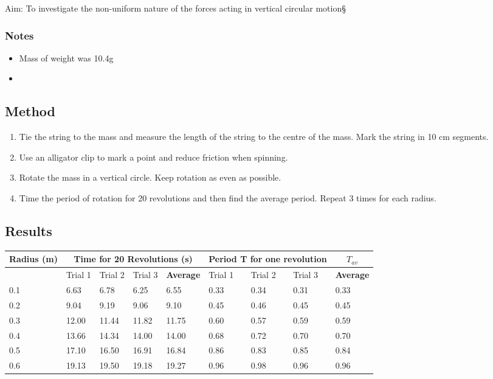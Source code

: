 	Aim: To investigate the non-uniform nature of the forces acting in vertical circular motion\S
	
	\subsubsection{Notes}
	\begin{itemize}
		\item Mass of weight was 10.4g
		\item 
	\end{itemize}

	\subsection{Method}
		\begin{enumerate}
			\item Tie the string to the mass and measure the length of the string to the centre of the mass. Mark the string in 10 cm segments.
			\item Use an alligator clip to mark a point and reduce friction when spinning.
			\item Rotate the mass in a vertical circle. Keep rotation as even as possible.
			\item Time the period of rotation for 20 revolutions and then find the average period. Repeat 3 times for each radius.
		\end{enumerate}

	\subsection{Results}
		\begin{table}[htbp]
			\centering
			  \begin{tabular}{l|llll|lll|l}
			  \multicolumn{1}{c}{Radius (m)} & \multicolumn{4}{c}{Time for 20 Revolutions (s)} & \multicolumn{3}{c}{Period T for one revolution} & \multicolumn{1}{c}{$T_{av}$} \\[5pt] \hline
					& Trial 1 & Trial 2 & Trial 3 & \textbf{Average} & Trial 1 & Trial 2 & Trial 3 & \textbf{Average} \\
			  0.1   & 6.63  & 6.78  & 6.25  & 6.55  & 0.33  & 0.34  & 0.31  & 0.33 \\
			  0.2   & 9.04  & 9.19  & 9.06  & 9.10  & 0.45  & 0.46  & 0.45  & 0.45 \\
			  0.3   & 12.00 & 11.44 & 11.82 & 11.75 & 0.60  & 0.57  & 0.59  & 0.59 \\
			  0.4   & 13.66 & 14.34 & 14.00 & 14.00 & 0.68  & 0.72  & 0.70  & 0.70 \\
			  0.5   & 17.10 & 16.50 & 16.91 & 16.84 & 0.86  & 0.83  & 0.85  & 0.84 \\
			  0.6   & 19.13 & 19.50 & 19.18 & 19.27 & 0.96  & 0.98  & 0.96  & 0.96 \\
			\end{tabular}
		\end{table}
		
